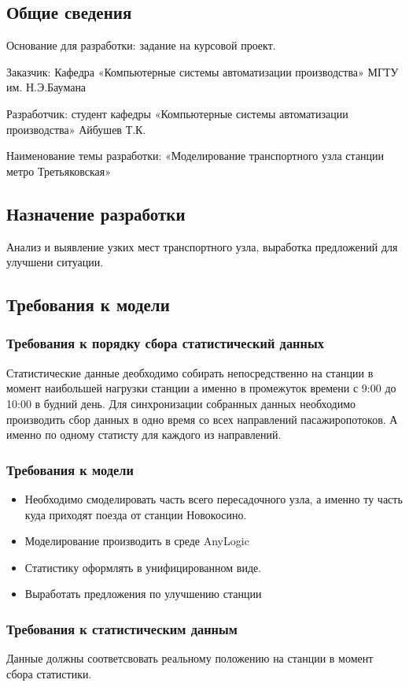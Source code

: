 \documentclass[12pt]{article}
\begin{document}
	
	\subsection{Общие сведения }
	
	Основание для разработки: задание на курсовой проект.
	
	Заказчик: Кафедра «Компьютерные системы автоматизации производства» МГТУ им. Н.Э.Баумана
	
	Разработчик: студент кафедры «Компьютерные системы автоматизации производства»  Айбушев Т.К.
	
	Наименование темы разработки: «Моделирование транспортного узла станции метро Третьяковская»
	
	\subsection{Назначение разработки }
	Анализ и выявление узких мест транспортного узла, выработка предложений для улучшени ситуации.
	\subsection{Требования к модели }
		\subsubsection{Требования к порядку сбора статистический данных }
		Статистические данные деобходимо собирать непосредственно на станции в момент наибольшей нагрузки станции а именно в промежуток времени с 9:00 до 10:00 в будний день. Для синхронизации собранных данных необходимо производить сбор данных в одно время со всех направлений пасажиропотоков.  А именно по одному статисту для каждого из направлений. 
		\subsubsection{Требования к модели}
\begin{itemize}
	\item Необходимо смоделировать часть всего пересадочного узла, а именно ту часть куда приходят поезда от станции Новокосино. 
	\item Моделирование производить в среде AnyLogic
	\item Статистику оформлять в унифицированном виде.
	\item Выработать предложения по улучшению станции
\end{itemize}

		\subsubsection{ Требования к статистическим данным }
		Данные должны соответсвовать реальному положению на станции в момент сбора статистики. 
\end{document}
